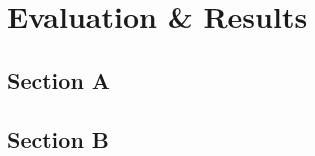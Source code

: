 \chapter{Evaluation \& Results}\label{ch:evaluation} %

\lipsum[2]

\section{Section A}
\lipsum[5-9]

\section{Section B}
\lipsum[9-17]
